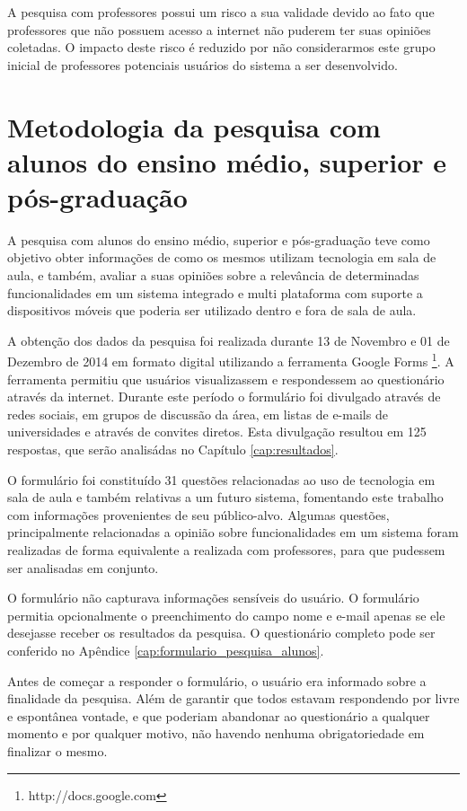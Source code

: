 A pesquisa com professores possui um risco a sua validade devido ao fato que professores que não possuem acesso a internet não puderem ter suas opiniões coletadas. O impacto deste risco é reduzido por não considerarmos este grupo inicial de professores potenciais usuários do sistema a ser desenvolvido.


\section{Metodologia da pesquisa com alunos do ensino médio, superior e pós-graduação}
\label{sec:metodologia_alunos}

A pesquisa com alunos do ensino médio, superior e pós-graduação teve como objetivo obter informações de como os mesmos utilizam tecnologia em sala de aula, e também, avaliar a suas opiniões sobre a relevância de determinadas funcionalidades em um sistema integrado e multi plataforma com suporte a dispositivos móveis que poderia ser utilizado dentro e fora de sala de aula.

A obtenção dos dados da pesquisa foi realizada durante 13 de Novembro e 01 de Dezembro de 2014 em formato digital utilizando a ferramenta Google Forms \footnote{http://docs.google.com}. A ferramenta permitiu que usuários visualizassem e respondessem ao questionário através da internet. Durante este período o formulário foi divulgado através de redes sociais, em grupos de discussão da área, em listas de e-mails de universidades e através de convites diretos. Esta divulgação resultou em 125 respostas, que serão analisádas no Capítulo \ref{cap:resultados}.

O formulário foi constituído 31 questões relacionadas ao uso de tecnologia em sala de aula e também relativas a um futuro sistema, fomentando este trabalho com informações provenientes de seu público-alvo. Algumas questões, principalmente relacionadas a opinião sobre funcionalidades em um sistema foram realizadas de forma equivalente a realizada com professores, para que pudessem ser analisadas em conjunto.

O formulário não capturava informações sensíveis do usuário. O formulário permitia opcionalmente o preenchimento do campo nome e e-mail apenas se ele desejasse receber os resultados da pesquisa. O questionário completo pode ser conferido no Apêndice \ref{cap:formulario_pesquisa_alunos}.

Antes de começar a responder o formulário, o usuário era informado sobre a finalidade da pesquisa. Além de garantir que todos estavam respondendo por livre e espontânea vontade, e que poderiam abandonar ao questionário a qualquer momento e por qualquer motivo, não havendo nenhuma obrigatoriedade em finalizar o mesmo.



